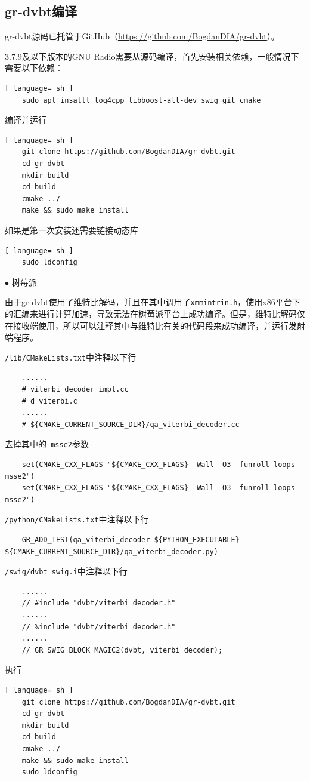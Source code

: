 		\subsection{gr-dvbt编译}
			\label{sec:gr-dvbt_compile}
			\par gr-dvbt源码已托管于GitHub（\href{https://github.com/BogdanDIA/gr-dvbt}{https://github.com/BogdanDIA/gr-dvbt}）。
			\par 3.7.9及以下版本的GNU Radio需要从源码编译，首先安装相关依赖，一般情况下需要以下依赖：
			\begin{lstlisting}[ language= sh ]
	sudo apt insatll log4cpp libboost-all-dev swig git cmake
			\end{lstlisting}
			\par 编译并运行
			\begin{lstlisting}[ language= sh ]
	git clone https://github.com/BogdanDIA/gr-dvbt.git
	cd gr-dvbt
	mkdir build
	cd build
	cmake ../
	make && sudo make install
			\end{lstlisting}
			\par 如果是第一次安装还需要链接动态库
			\begin{lstlisting}[ language= sh ]
	sudo ldconfig
			\end{lstlisting}
			\par\noindent $\bullet$ 树莓派
			\par 由于gr-dvbt使用了维特比解码，并且在其中调用了\lstinline{xmmintrin.h}，使用x86平台下的汇编来进行计算加速，导致无法在树莓派平台上成功编译。但是，维特比解码仅在接收端使用，所以可以注释其中与维特比有关的代码段来成功编译，并运行发射端程序。
			\par \lstinline{/lib/CMakeLists.txt}中注释以下行
			\begin{lstlisting}
	......
	# viterbi_decoder_impl.cc
    # d_viterbi.c
	......
	# ${CMAKE_CURRENT_SOURCE_DIR}/qa_viterbi_decoder.cc

			\end{lstlisting}
			\par 去掉其中的\lstinline{-msse2}参数
			\begin{lstlisting}
	set(CMAKE_CXX_FLAGS "${CMAKE_CXX_FLAGS} -Wall -O3 -funroll-loops -msse2")
	set(CMAKE_CXX_FLAGS "${CMAKE_CXX_FLAGS} -Wall -O3 -funroll-loops -msse2")
			\end{lstlisting}
			\par \lstinline{/python/CMakeLists.txt}中注释以下行
			\begin{lstlisting}
	GR_ADD_TEST(qa_viterbi_decoder ${PYTHON_EXECUTABLE} ${CMAKE_CURRENT_SOURCE_DIR}/qa_viterbi_decoder.py)
			\end{lstlisting}
			\par \lstinline{/swig/dvbt_swig.i}中注释以下行
			\begin{lstlisting}
	......
	// #include "dvbt/viterbi_decoder.h"
	......
	// %include "dvbt/viterbi_decoder.h"
	......
	// GR_SWIG_BLOCK_MAGIC2(dvbt, viterbi_decoder);
			\end{lstlisting}
			\par 执行
			\begin{lstlisting}[ language= sh ]
	git clone https://github.com/BogdanDIA/gr-dvbt.git
	cd gr-dvbt
	mkdir build
	cd build
	cmake ../
	make && sudo make install
	sudo ldconfig
			\end{lstlisting}